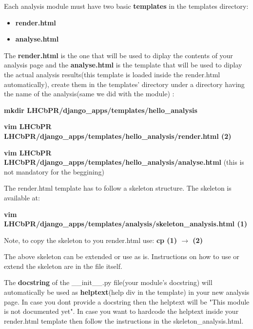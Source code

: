 \documentclass{lhcbnote}
\begin{document}
\vspace{4 mm}

Each analysis module must have two basic {\bf templates} in the templates directory:
 \begin{itemize}
\item
{\bf render.html}
\item
{\bf analyse.html}
\end{itemize}

The {\bf render.html} is the one that will be used to diplay the contents of your analysis page
and the {\bf analyse.html} is the template that will be used to diplay the actual analysis results(this template is loaded inside the render.html automatically), 
create them in the templates' directory under a directory having the name of the analysis(same we did with the module) :

\vspace{2 mm}

{\bf mkdir LHCbPR/django\_apps/templates/hello\_analysis}

\vspace{2 mm}

{\bf vim LHCbPR LHCbPR/django\_apps/templates/hello\_analysis/render.html    (2)}

\vspace{2 mm}


{\bf vim LHCbPR LHCbPR/django\_apps/templates/hello\_analysis/analyse.html} (this is not mandatory for the beggining)
 \vspace{2 mm}

The render.html template has to follow a skeleton structure. The skeleton is available at:

\vspace{2 mm}

{\bf vim LHCbPR/django\_apps/templates/analysis/skeleton\_analysis.html     (1)}

Note, to copy the skeleton to you render.html use: {\bf cp (1) $\rightarrow$ (2)}	

\vspace{2 mm}

The above skeleton can be extended or use as is. Instructions on how to use or extend the skeleton are in the file itself. 

\vspace{2 mm}

The {\bf docstring} of the \_\_init\_\_.py file(your module's docstring) will automatically be used as {\bf helptext}(help div in the template) in your new analysis page.
In case you dont provide a docstring then the helptext will be "This module is not documented yet". In case you want to hardcode the helptext inside your render.html template
then follow the instructions in the skeleton\_analysis.html.
\end{document}
